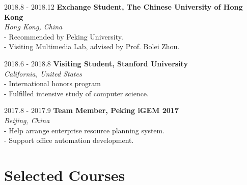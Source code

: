 \documentclass{academiccv}
\begin{document}
\begin{tablist}

\item[2018.8 - 2018.12] 	\tab \textbf {Exchange Student, The Chinese University of Hong Kong} \textbf
					\\ \tab \emph{Hong Kong, China}\emph
					\\ \tab - Recommended by Peking University.
				      \\ \tab - Visiting Multimedia Lab, advised by Prof. Bolei Zhou.
				   

\item[2018.6 - 2018.8] 	\tab \textbf {Visiting Student, Stanford University} \textbf
					\\ \tab \emph{California, United States}\emph
				      \\ \tab - International honors program
				     \\ \tab - Fulfilled intensive study of computer science.
				     
\item[2017.8 - 2017.9] 	\tab \textbf {Team Member, Peking iGEM 2017} \textbf
					\\ \tab \emph{Beijing, China}\emph
				      \\ \tab - Help arrange enterprise resource planning system.
				     \\ \tab - Support office automation development.			   
				     
				     
				     
				     				      
\end{tablist}

\section*{Selected Courses}
\end{document}
